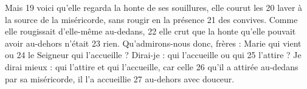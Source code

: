 Mais	 
19	 	voici qu'elle regarda la honte de ses souillures, elle courut les	 
20	 	laver à la source de la miséricorde, sans rougir en la présence	 
21	 	des convives. Comme elle rougissait d'elle-même au-dedans,	 
22	 	elle crut que la honte qu'elle pouvait avoir au-dehors n'était	 
23	 	rien. Qu'admirons-nous donc, frères : Marie qui vient ou	 
24	 	le Seigneur qui l'accueille ? Dirai-je : qui l'accueille ou qui	 
25	 	l'attire ? Je dirai mieux : qui l'attire et qui l'accueille, car celle	 
26	 	qu'il a attirée au-dedans par sa miséricorde, il l'a accueillie	 
27	 	au-dehors avec douceur.